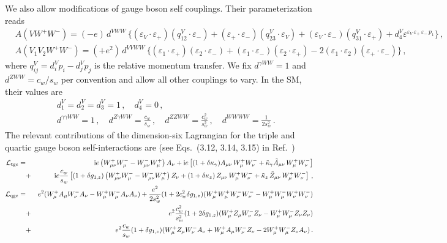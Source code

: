 \documentclass[aps,superscriptaddress,nofootinbib]{revtex4}
\begin{document}
We also allow modifications of gauge boson self couplings. 
Their parameterization reads
\begin{eqnarray}
 & A({VW^+W^-}) = (-e) \,  d^{VWW} \, \bigg\{  
                          (\varepsilon_V \cdot \varepsilon_+)(q_{12}^V \cdot \varepsilon_-)
                         +(\varepsilon_+ \cdot \varepsilon_-)(q_{23}^V \cdot \varepsilon_V)
                         +(\varepsilon_V \cdot \varepsilon_-)(q_{31}^V \cdot \varepsilon_+)
                         + d^V_4 \varepsilon^{\varepsilon_V\,\varepsilon_+\,\varepsilon_-\,p_1}
                               \bigg\} \,, \;\;
\label{eq:VVV}                               
\\
 & A({V_1 V_2 W^+W^-}) = (+e^2) \,  d^{VVWW} \, \bigg\{  
                               (\varepsilon_{1} \cdot \varepsilon_{+})  (\varepsilon_{2} \cdot \varepsilon_{-})
                              +(\varepsilon_{1} \cdot \varepsilon_{-})  (\varepsilon_{2} \cdot \varepsilon_{+})
                             -2(\varepsilon_{1} \cdot \varepsilon_{2})  (\varepsilon_{+} \cdot \varepsilon_{-})
                               \bigg\} \,,
\label{eq:VVVV}
\end{eqnarray}
where $q_{ij}^V = d_i^V p_i - d_j^V p_j$ is the relative momentum transfer. 
We fix $d^{\gamma WW}  = 1$ and $d^{Z WW} = {c_w}/{s_w}$ per convention and allow all other couplings to vary. 
In the SM, their values are
\begin{eqnarray}
\label{eq:VVVVSM}
&& d_1^V =d_2^V =d_3^V =1\,,
\quad
d_4^V=0\,, 
\\
&& d^{\gamma\gamma WW} = 1\,,
\quad
d^{Z\gamma WW} = \frac{c_w}{s_w}\,,
\quad
d^{ZZWW} = \frac{c_w^2}{s_w^2}\,,
\quad
d^{WWWW} = \frac{1}{2 s_w^2} \,. 
\nonumber
\end{eqnarray}
The relevant contributions of the dimension-six Lagrangian for the triple and quartic gauge boson self-interactions are 
(see Eqs.~(3.12, 3.14, 3.15)  in Ref.~\cite{Falkowski:2001958})
\begin{eqnarray} 
\label{eq:EFT_tgc}
 {\cal L}_{\rm tgc}  = &  &
 \mathrm{i}  e    \left ( W_{\mu \nu}^+ W_\mu^-  -  W_{\mu \nu}^- W_\mu^+ \right ) A_\nu   
 + \mathrm{i}  e  \left [  (1 + \delta \kappa_\gamma )  A_{\mu\nu}\,W_\mu^+W_\nu^-   
+ \tilde \kappa_\gamma  \tilde A_{\mu\nu}\,W_\mu^+W_\nu^-  \right ]
\nonumber \\  &  + & \mathrm{i} e \frac{c_w}{s_w}  \left [  (1 + \delta g_{1,z})   \left ( W_{\mu \nu}^+ W_\mu^-  -  W_{\mu \nu}^- W_\mu^+ \right ) Z_\nu 
 + (1 +  \delta \kappa_z) \, Z_{\mu\nu}\,W_\mu^+W_\nu^-   
 +  \tilde  \kappa_z \,  \tilde Z_{\mu\nu}\,W_\mu^+W_\nu^-   \right ] \,,
\\
\label{eq:EFT_qgc}
 {\cal L}_{\rm qgc}  = &  &
 e^2 ( W^+_\mu A_\mu W^-_\nu A_\nu - W^+_\mu W^-_\mu A_\nu A_\nu  ) 
 + \frac{e^2}{2 s_w^2} (1+2 c_w^2 \delta g_{1,z}) ( W^+_\mu W^+_\mu W^-_\nu W^-_\nu -  W^+_\mu W^-_\mu W^+_\nu W^-_\nu )
 \nonumber \\ &+ & 
 e^2 \frac{c_w^2}{s_w^2}  (1+2\delta g_{1,z} ) ( W^+_\mu Z_\mu W^-_\nu Z_\nu -  W^+_\mu W^-_\mu Z_\nu Z_\nu )
 \nonumber \\ &+ &  
 e^2 \frac{c_w}{s_w} (1+\delta g_{1,z} ) ( W^+_\mu Z_\mu W^-_\nu A_\nu + W^+_\mu A_\mu W^-_\nu Z_\nu  - 2  W^+_\mu W^-_\mu Z_\nu A_\nu  )
 \,.
\end{eqnarray} 
\end{document}
